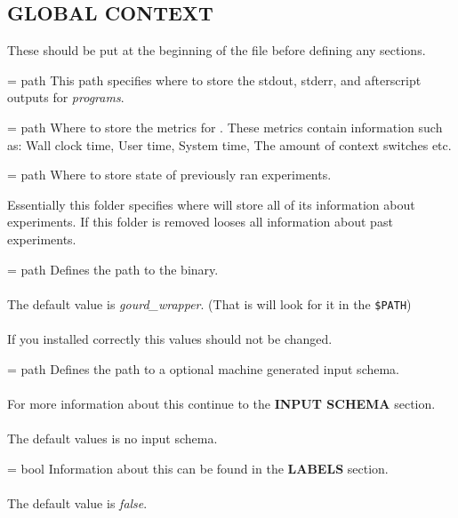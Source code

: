 \documentclass[a4paper,english]{article}
\begin{document}
\begin{adjustwidth}{18pt}{0pt}
  \section{GLOBAL CONTEXT}

    These should be put at the beginning of the file before defining any sections.

    \begin{Description}[Options]\setlength{\itemsep}{0cm}
        \item[\Opt{output\_path} = path]
        This path specifies where to store the stdout, stderr, and afterscript
        outputs for \emph{programs}.

        \item[\Opt{metrics\_path} = path]
        Where to store the metrics for  .
        These metrics contain information such as: Wall clock time,
        User time, System time, The amount of context switches etc.

        \item[\Opt{experiments\_folder} = path]
        Where to store state of previously ran experiments.

        Essentially this folder specifies where  will store
        all of its information about experiments. If this folder is removed
         looses all information about past experiments.

        \item[\Opt{wrapper?} = path]
        Defines the path to the  binary. \\ \\
        The default value is \emph{gourd\_wrapper}. (That is 
        will look for it in the \texttt{\$PATH}) \\ \\
        If you installed  correctly this values should not be
        changed.

        \item[\Opt{input\_schema?} = path]
        Defines the path to a optional machine generated input schema. \\ \\
        For more information about this continue to the \textbf{INPUT SCHEMA}
        section. \\ \\
        The default values is no input schema.

        \item[\Opt{warn\_on\_label\_overlap?} = bool]
        Information about this can be found in the \textbf{LABELS}
        section. \\ \\
        The default value is \emph{false}.
    \end{Description}


\end{adjustwidth}
\end{document}
